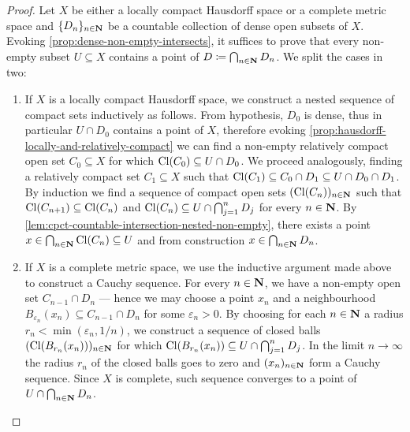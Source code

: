 \begin{proof}
Let \(X\) be either a locally compact Hausdorff space or a complete metric space
and \(\{D_n\}_{n \in \mathbf{N}}\) be a countable collection of dense open subsets of
\(X\). Evoking \cref{prop:dense-non-empty-intersects}, it suffices to prove that
every non-empty subset \(U \subseteq X\) contains a point of
\(D \coloneq \bigcap_{n \in \mathbf{N}} D_n\). We split the cases in two:
\begin{enumerate}\setlength\itemsep{0em}
\item If \(X\) is a locally compact Hausdorff space, we construct a nested
  sequence of compact sets inductively as follows. From hypothesis, \(D_0\) is
  dense, thus in particular \(U \cap D_0\) contains a point of \(X\), therefore
  evoking \cref{prop:hausdorff-locally-and-relatively-compact} we can find a
  non-empty relatively compact open set \(C_0 \subseteq X\) for which
  \(\operatorname{Cl}(C_0) \subseteq U \cap D_0\). We proceed analogously, finding a
  relatively compact set \(C_1 \subseteq X\) such that
  \(\operatorname{Cl}(C_1) \subseteq C_0 \cap D_1 \subseteq U \cap D_0 \cap D_1\). By
  induction we find a sequence of compact open sets \((\operatorname{Cl}(C_n))_{n \in \mathbf{N}}\)
  such that \(\operatorname{Cl}(C_{n+1}) \subseteq \operatorname{Cl}(C_{n})\) and
  \(\operatorname{Cl}(C_n) \subseteq U \cap \bigcap_{j=1}^n D_j\) for every \(n \in \mathbf{N}\). By
  \cref{lem:cpct-countable-intersection-nested-non-empty}, there exists a point
  \(x \in \bigcap_{n \in \mathbf{N}} \operatorname{Cl}(C_n) \subseteq U\) and from construction
  \(x \in \bigcap_{n \in \mathbf{N}} D_n\).

\item If \(X\) is a complete metric space, we use the inductive argument made
  above to construct a Cauchy sequence. For every \(n \in \mathbf{N}\), we have a
  non-empty open set \(C_{n-1} \cap D_n\) --- hence we may choose a point
  \(x_n\) and a neighbourhood
  \(B_{\varepsilon_n}(x_n) \subseteq C_{n-1} \cap D_n\) for some
  \(\varepsilon_n > 0\). By choosing for each \(n \in \mathbf{N}\) a radius
  \(r_n < \min(\varepsilon_n, 1/n)\), we construct a sequence of closed balls
  \((\operatorname{Cl}(B_{r_n}(x_n)))_{n \in \mathbf{N}}\) for which
  \(\operatorname{Cl}(B_{r_n}(x_n)) \subseteq U \cap \bigcap_{j=1}^n D_j\). In the limit
  \(n \to \infty\) the radius \(r_n\) of the closed balls goes to zero and
  \((x_n)_{n \in \mathbf{N}}\) form a Cauchy sequence. Since \(X\) is complete, such
  sequence converges to a point of \(U \cap \bigcap_{n \in \mathbf{N}} D_n\).
\end{enumerate}
\end{proof}


